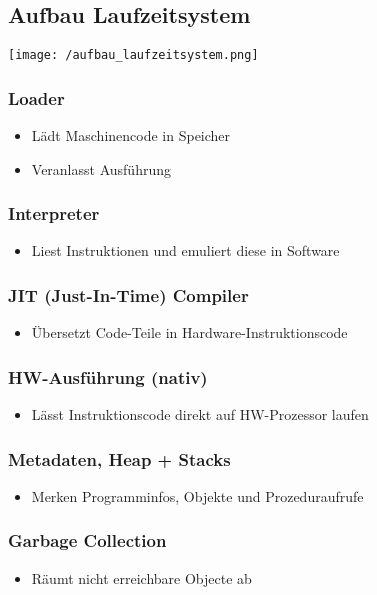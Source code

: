 \subsection{Aufbau Laufzeitsystem}
\begin{center}
    \texttt{[image: /aufbau\_laufzeitsystem.png]} 
\end{center}
\subsubsection{Loader}
\begin{itemize}
    \item Lädt Maschinencode in Speicher
    \item Veranlasst Ausführung
\end{itemize}
\subsubsection{Interpreter}
\begin{itemize}
    \item Liest Instruktionen und emuliert diese in Software
\end{itemize}
\subsubsection{JIT (Just-In-Time) Compiler}
\begin{itemize}
    \item Übersetzt Code-Teile in Hardware-Instruktionscode
\end{itemize}
\subsubsection{HW-Ausführung (nativ)}
\begin{itemize}
    \item Lässt Instruktionscode direkt auf HW-Prozessor laufen
\end{itemize}
\subsubsection{Metadaten, Heap + Stacks}
\begin{itemize}
    \item Merken Programminfos, Objekte und Prozeduraufrufe
\end{itemize}
\subsubsection{Garbage Collection}
\begin{itemize}
    \item Räumt nicht erreichbare Objecte ab
\end{itemize}
\newpage

